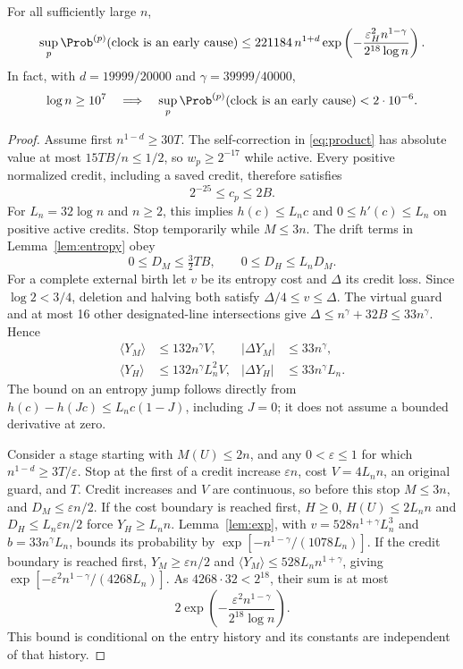 \begin{corollary}\label{cor:clockexplicit}
For all sufficiently large \(n\),
\begin{equation}\label{eq:clockexplicit}
 \sup_p\Prob^{(p)}(\text{clock is an early cause})
 \le221184\,n^{1+d}
 \exp\left(-\frac{\varepsilon_H^2 n^{1-\gamma}}
                     {2^{18}\log n}\right).
\end{equation}
In fact, with \(d=19999/20000\) and \(\gamma=39999/40000\),
\begin{equation}\label{eq:clockthreshold}
 \log n\ge10^7\quad\Longrightarrow\quad
 \sup_p\Prob^{(p)}(\text{clock is an early cause})<2\cdot10^{-6}.
\end{equation}
\end{corollary}
\begin{proof}
Assume first \(n^{1-d}\ge30T\). The self-correction in
\eqref{eq:product} has absolute value at most \(15TB/n\le1/2\),
so \(w_p\ge2^{-17}\) while active. Every positive normalized
credit, including a saved credit, therefore satisfies
\[
 2^{-25}\le c_p\le2B.
\]
For \(L_n=32\log n\) and \(n\ge2\), this implies
\(h(c)\le L_nc\) and \(0\le h'(c)\le L_n\) on positive active
credits. Stop temporarily while \(M\le3n\). The drift terms in
Lemma~\ref{lem:entropy} obey
\[
 0\le D_M\le\tfrac32TB,\qquad 0\le D_H\le L_nD_M.
\]
For a complete external birth let \(v\) be its entropy cost and
\(\Delta\) its credit loss. Since \(\log2<3/4\), deletion and
halving both satisfy \(\Delta/4\le v\le\Delta\). The virtual
guard and at most 16 other designated-line intersections give
\(\Delta\le n^\gamma+32B\le33n^\gamma\). Hence
\begin{align*}
 \langle Y_M\rangle&\le132n^\gamma V,
 &|\Delta Y_M|&\le33n^\gamma,\\
 \langle Y_H\rangle&\le132n^\gamma L_n^2V,
 &|\Delta Y_H|&\le33n^\gamma L_n.
\end{align*}
The bound on an entropy jump follows directly from
\(h(c)-h(Jc)\le L_nc(1-J)\), including \(J=0\);
it does not assume a bounded derivative at zero.

Consider a stage starting with \(M(U)\le2n\), and any
\(0<\varepsilon\le1\) for which
\(n^{1-d}\ge3T/\varepsilon\). Stop at the first of a credit
increase \(\varepsilon n\), cost \(V=4L_nn\), an original guard,
and \(T\). Credit increases and \(V\) are continuous, so before
this stop \(M\le3n\), and \(D_M\le\varepsilon n/2\).
If the cost boundary is reached first, \(H\ge0\),
\(H(U)\le2L_nn\) and \(D_H\le L_n\varepsilon n/2\) force
\(Y_H\ge L_nn\). Lemma~\ref{lem:exp}, with
\(v=528n^{1+\gamma}L_n^3\) and \(b=33n^\gamma L_n\), bounds
its probability by
\(\exp[-n^{1-\gamma}/(1078L_n)]\).
If the credit boundary is reached first, \(Y_M\ge\varepsilon n/2\)
and \(\langle Y_M\rangle\le528L_nn^{1+\gamma}\), giving
\(\exp[-\varepsilon^2n^{1-\gamma}/(4268L_n)]\).
As \(4268\cdot32<2^{18}\), their sum is at most
\[
 2\exp\left(-\frac{\varepsilon^2n^{1-\gamma}}
                         {2^{18}\log n}\right).
\]
This bound is conditional on the entry history and its constants
are independent of that history.


\end{proof}
